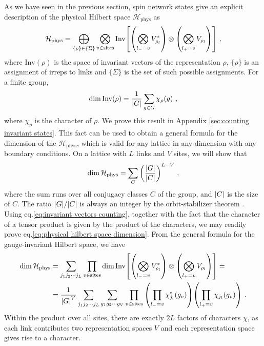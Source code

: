 As we have seen in the previous section, spin network states give an explicit description of the physical Hilbert space $\mathcal{H}_{\mathrm{phys}}$ as
\begin{equation}
    \mathcal{H}_{\mathrm{phys}} =\bigoplus_{\{\rho\} \in \{\Sigma\}} \bigotimes_{v \in \mathrm{sites}} \mathrm{Inv}\bqty{\pqty{\bigotimes_{l_- = v}  V_{\rho_l}^*} \otimes \pqty{\bigotimes_{l_+ = v}  V_{\rho_l}}} \ ,
\end{equation}
where $\mathrm{Inv}(\rho)$ is the space of invariant vectors of the representation $\rho$, $\{\rho\}$ is an assignment of irreps to links and $\{\Sigma\}$ is the set of such possible assignments.
For a finite group,
\begin{equation}
    \label{eq:invariant vectors counting}
    \dim{\mathrm{Inv}(\rho)} = \frac{1}{\abs{G}} \sum_{g \in G} \chi_\rho(g) \ ,
\end{equation}
where $\chi_\rho$ is the character of $\rho$.
We prove this result in Appendix \ref{sec:counting invariant states}.
This fact can be used to obtain a general formula for the dimension of the $\mathcal{H}_{\mathrm{phys}}$, which is valid for any lattice in any dimension with any boundary conditions.
On a lattice with $L$ links and $V$ sites, we will show that
\begin{equation}
    \label{eq:physical hilbert space dimension}
    \dim{\mathcal{H}_{\mathrm{phys}}} = \sum_C \pqty{\frac{\abs{G}}{\abs{C}}}^{L-V} \ ,
\end{equation}
where the sum runs over all conjugacy classes $C$ of the group, and $\abs{C}$ is the size of $C$.
The ratio $\abs{G}/\abs{C}$ is always an integer by the orbit-stabilizer theorem \cite{Serre}.
Using eq.\eqref{eq:invariant vectors counting}, together with the fact that the character of a tensor product is given by the product of the characters, we may readily prove eq.\eqref{eq:physical hilbert space dimension}.
From the general formula for the gauge-invariant Hilbert space, we have
\begin{align}
    \dim{\mathcal{H}_{\mathrm{phys}}} &=\sum_{j_1 j_2 \cdots j_L} \prod_{v \in \mathrm{sites}} \dim\mathrm{Inv}\bqty{\pqty{\bigotimes_{l_- = v}  V_{\rho_l}^*} \otimes \pqty{\bigotimes_{l_+ = v}  V_{\rho_l}}} = \nonumber \\
    &=\frac{1}{\abs{G}^V}\sum_{j_1 j_2 \cdots j_L} \sum_{g_1 g_2 \cdots g_V} \prod_{v \in \mathrm{sites}} \pqty{\prod_{l_- = v}  \chi_{j_l}^*(g_v)}  \pqty{\prod_{l_+ = v} \chi_{j_l}(g_v)} \nonumber \ .
\end{align}
Within the product over all sites, there are exactly $2L$ factors of characters $\chi$, as each link contributes two representation spaces $V$ and each representation space gives rise to a character.
